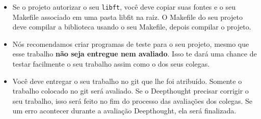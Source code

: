 \begin{itemize}
      \item Se o projeto autorizar o seu \texttt{libft}, você deve copiar suas fontes e 
        o seu Makefile associado em uma pasta libfit na raiz.
        O Makefile do seu projeto deve compilar a biblioteca usando o seu Makefile,
        depois compilar o projeto.

      \item Nós recomendamos criar programas de teste para o seu projeto,
        mesmo que esse trabalho \textbf{não seja entregue nem avaliado}. Isso te dará uma chance
        de testar facilmente o seu trabalho assim como o dos seus colegas. 

      \item Você deve entregar o seu trabalho no git que lhe foi atribuído. Somente o trabalho
        colocado no git será avaliado. Se o Deepthought precisar corrigir o seu trabalho, isso será feito
        no fim do processo das avaliações dos colegas.
        Se um erro acontecer durante a avaliação Deepthought, ela será finalizada.
    \end{itemize}
